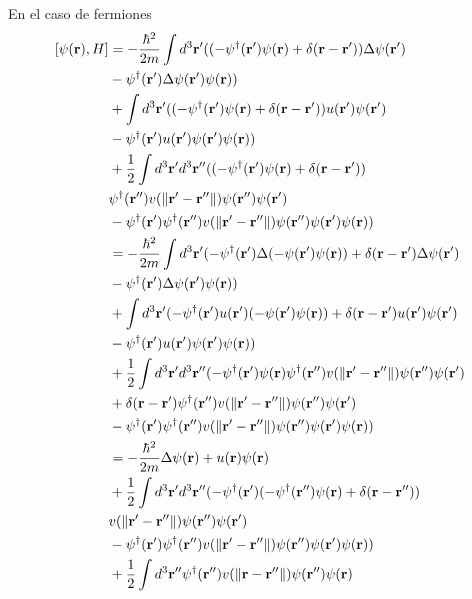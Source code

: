 \documentclass{article}
\begin{document}
En el caso de fermiones
\begin{align}
\begin{split}
[\psi(\vb{r}),H]&=-\frac{\hbar^2}{2m}\int d^3\vb{r}'((-\psi^\dagger(\vb{r}')\psi(\vb{r})+\delta(\vb{r}-\vb{r}'))\Delta\psi(\vb{r}')\\
&-\psi^\dagger(\vb{r}')\Delta\psi(\vb{r}')\psi(\vb{r}))\\
&+\int d^3\vb{r}'((-\psi^\dagger(\vb{r}')\psi(\vb{r})+\delta(\vb{r}-\vb{r}'))u(\vb{r}')\psi(\vb{r}')\\
&-\psi^\dagger(\vb{r}')u(\vb{r}')\psi(\vb{r}')\psi(\vb{r}))\\
&+\frac{1}{2}\int d^3\vb{r}'d^3\vb{r}''((-\psi^\dagger(\vb{r}')\psi(\vb{r})+\delta(\vb{r}-\vb{r}'))\\
&\psi^\dagger(\vb{r}'')v(\|\vb{r}'-\vb{r}''\|)\psi(\vb{r}'')\psi(\vb{r}')\\
&-\psi^\dagger(\vb{r}')\psi^\dagger(\vb{r}'')v(\|\vb{r}'-\vb{r}''\|)\psi(\vb{r}'')\psi(\vb{r}')\psi(\vb{r}))\\
&=-\frac{\hbar^2}{2m}\int d^3\vb{r}'(-\psi^\dagger(\vb{r}')\Delta(-\psi(\vb{r}')\psi(\vb{r}))+\delta(\vb{r}-\vb{r}')\Delta\psi(\vb{r}')\\
&-\psi^\dagger(\vb{r}')\Delta\psi(\vb{r}')\psi(\vb{r}))\\
&+\int d^3\vb{r}'(-\psi^\dagger(\vb{r}')u(\vb{r}')(-\psi(\vb{r}')\psi(\vb{r}))+\delta(\vb{r}-\vb{r}')u(\vb{r}')\psi(\vb{r}')\\
&-\psi^\dagger(\vb{r}')u(\vb{r}')\psi(\vb{r}')\psi(\vb{r}))\\
&+\frac{1}{2}\int d^3\vb{r}'d^3\vb{r}''(-\psi^\dagger(\vb{r}')\psi(\vb{r})\psi^\dagger(\vb{r}'')v(\|\vb{r}'-\vb{r}''\|)\psi(\vb{r}'')\psi(\vb{r}')\\
&+\delta(\vb{r}-\vb{r}')\psi^\dagger(\vb{r}'')v(\|\vb{r}'-\vb{r}''\|)\psi(\vb{r}'')\psi(\vb{r}')\\
&-\psi^\dagger(\vb{r}')\psi^\dagger(\vb{r}'')v(\|\vb{r}'-\vb{r}''\|)\psi(\vb{r}'')\psi(\vb{r}')\psi(\vb{r}))\\
&=-\frac{\hbar^2}{2m}\Delta\psi(\vb{r})+u(\vb{r})\psi(\vb{r})\\
&+\frac{1}{2}\int d^3\vb{r}'d^3\vb{r}''(-\psi^\dagger(\vb{r}')(-\psi^\dagger(\vb{r}'')\psi(\vb{r})+\delta(\vb{r}-\vb{r}''))\\
&v(\|\vb{r}'-\vb{r}''\|)\psi(\vb{r}'')\psi(\vb{r}')\\
&-\psi^\dagger(\vb{r}')\psi^\dagger(\vb{r}'')v(\|\vb{r}'-\vb{r}''\|)\psi(\vb{r}'')\psi(\vb{r}')\psi(\vb{r}))\\
&+\frac{1}{2}\int d^3\vb{r}''\psi^\dagger(\vb{r}'')v(\|\vb{r}-\vb{r}''\|)\psi(\vb{r}'')\psi(\vb{r})\\

\end{split}
\end{align}
\end{document}
